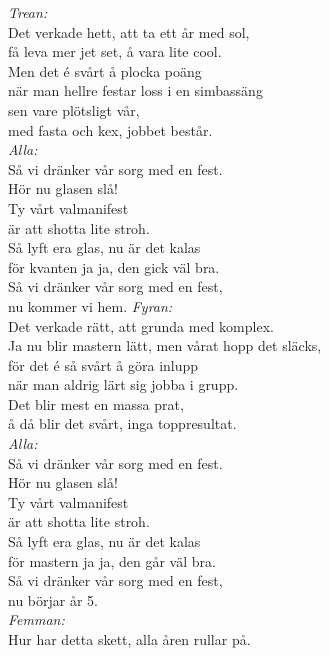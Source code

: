 \documentclass[a6paper,10pt]{article}
\begin{document}
\textit{Trean:} \\
Det verkade hett, att ta ett år med sol, \\
få leva mer jet set, å vara lite cool. \\
Men det é svårt å plocka poäng \\
när man hellre festar loss i en simbassäng \\
sen vare plötsligt vår, \\
med fasta och kex, jobbet består. 
\vspace{5pt} \\
\textit{Alla:} \\
Så vi dränker vår sorg med en fest. \\
Hör nu glasen slå! \\
Ty vårt valmanifest \\
är att shotta lite stroh. \\
Så lyft era glas, nu är det kalas \\
för kvanten ja ja, den gick väl bra. \\
Så vi dränker vår sorg med en fest, \\
nu kommer vi hem.
\newpage
\setlength{\oddsidemargin}{-0.37in}
\noindent
\textit{Fyran:} \\
Det verkade rätt, att grunda med komplex. \\
Ja nu blir mastern lätt, men vårat hopp det släcks, \\
för det é så svårt å göra inlupp \\
när man aldrig lärt sig jobba i grupp. \\
Det blir mest en massa prat, \\
å då blir det svårt, inga toppresultat. 
\vspace{5pt} \\
\textit{Alla:} \\
Så vi dränker vår sorg med en fest. \\
Hör nu glasen slå! \\
Ty vårt valmanifest \\
är att shotta lite stroh. \\
Så lyft era glas, nu är det kalas \\
för mastern ja ja, den går väl bra. \\
Så vi dränker vår sorg med en fest, \\
nu börjar år 5.
\vspace{5pt} \\
\textit{Femman:} \\
Hur har detta skett, alla åren rullar på. \\
\end{document}
